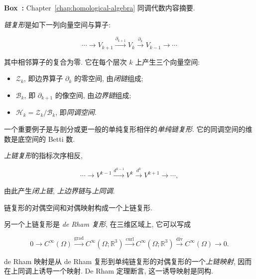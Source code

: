 \begin{MBSourceBox}
\label{box:homological-algebra-summary}
\noindent\textbf{Box~\thebooksummary:} {Chapter~\ref{chap:homological-algebra} 同调代数内容摘要.}\par

{\emph{链复形}是如下一列向量空间与算子:}

\[
\cdots\to V_{k+1}\xrightarrow{\partial_{k+1}}V_k\xrightarrow{\partial_k}V_{k-1}\to\cdots
\]

{其中相邻算子的复合为零. 它在每个层次 $k$ 上产生三个向量空间:}
\begin{itemize}
\item {$\mathcal Z_k$, 即边界算子 $\partial_k$ 的零空间, 由\emph{闭链}组成;}
\item {$\mathcal B_k$, 即 $\partial_{k+1}$ 的像空间, 由\emph{边界链}组成;}
\item {$\mathcal H_k=\mathcal Z_k/\mathcal B_k$, 即\emph{同调空间}.}
\end{itemize}

{一个重要例子是与剖分或更一般的单纯复形相伴的\emph{单纯链复形}. 它的同调空间的维数是底空间的 Betti 数.}

{\emph{上链复形}的指标次序相反,}

\[
\cdots\to V^{k-1}\xrightarrow{d^{k-1}}V^k\xrightarrow{d^k}V^{k+1}\to\cdots,
\]

{由此产生\emph{闭上链}, \emph{上边界链}与\emph{上同调}.}

{链复形的对偶空间和对偶映射构成一个上链复形.}

{另一个上链复形是 \emph{de Rham 复形}, 在三维区域上, 它可以写成}

\[
0\to C^\infty(\Omega)\xrightarrow{\operatorname{grad}}C^\infty(\Omega;\mathbb R^3)\xrightarrow{\operatorname{curl}}C^\infty(\Omega;\mathbb R^3)\xrightarrow{\operatorname{div}}C^\infty(\Omega)\to0.
\]

{de Rham 映射是从 de Rham 复形到单纯链复形的对偶复形的一个\emph{上链映射}, 因而在上同调上诱导一个映射. De Rham 定理断言, 这一诱导映射是同构.}
\end{MBSourceBox}
